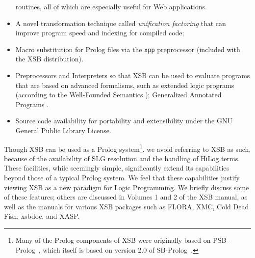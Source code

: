 \begin{itemize}
  routines, all of which are especially useful for Web applications.
%
\item A novel transformation technique called {\em unification
factoring} that can improve program speed and indexing for compiled
code; 
%
\item Macro substitution for Prolog files via the {\tt xpp}
  preprocessor (included with the XSB distribution).
%
\item Preprocessors and Interpreters so that XSB can be used to evaluate
  programs that are based on advanced formalisms, such as extended logic
  programs (according to the Well-Founded Semantics \cite{ADP94});
  Generalized Annotated Programs \cite{KiSu92}.
%
\item Source code availability for portability and extensibility under
  the GNU General Public Library License.
\end{itemize}
 
Though XSB can be used as a Prolog system\footnote{Many of the Prolog
  components of XSB were originally based on PSB-Prolog~\cite{Xu90},
  which itself is based on version 2.0 of SB-Prolog~\cite{Debr88}.},
we avoid referring to XSB as such, because of the availability of SLG
resolution and the handling of HiLog terms.  These facilities, while
seemingly simple, significantly extend its capabilities beyond those
of a typical Prolog system. We feel that these capabilities justify
viewing XSB as a new paradigm for Logic Programming.  We briefly
discuss some of these features; others are discussed in Volumes 1 and
2 of the XSB manual, as well as the manuals for various XSB packages
such as FLORA, XMC, Cold Dead Fish, xsbdoc, and XASP.

